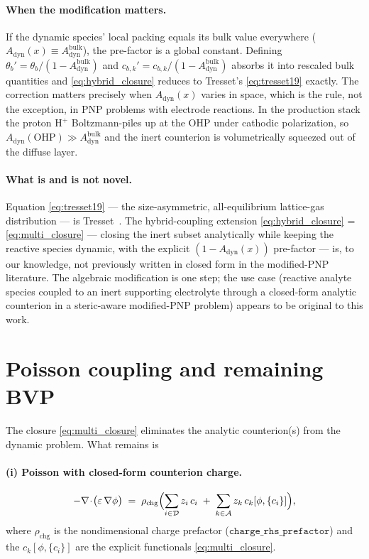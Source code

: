 \documentclass[11pt]{article}
\newcommand{\dynset}{\mathcal{D}}      %
\newcommand{\anset}{\mathcal{A}}       %
\begin{document}
\paragraph{When the modification matters.}
If the dynamic species' local packing equals its bulk value
everywhere ($A_{\mathrm{dyn}}(x) \equiv A_{\mathrm{dyn}}^{\mathrm{bulk}}$),
the pre-factor is a global constant. Defining $\theta_b' =
\theta_b/(1 - A_{\mathrm{dyn}}^{\mathrm{bulk}})$ and
$c_{b,k}' = c_{b,k}/(1 - A_{\mathrm{dyn}}^{\mathrm{bulk}})$ absorbs
it into rescaled bulk quantities and \eqref{eq:hybrid_closure}
reduces to Tresset's \eqref{eq:tresset19} exactly. The correction
matters precisely when $A_{\mathrm{dyn}}(x)$ varies in space, which
is the rule, not the exception, in PNP problems with electrode
reactions. In the production stack the proton $\mathrm{H}^+$
Boltzmann-piles up at the OHP under cathodic polarization, so
$A_{\mathrm{dyn}}(\mathrm{OHP}) \gg A_{\mathrm{dyn}}^{\mathrm{bulk}}$
and the inert counterion is volumetrically squeezed out of the
diffuse layer.

\paragraph{What is and is not novel.}
Equation \eqref{eq:tresset19} --- the size-asymmetric,
all-equilibrium lattice-gas distribution --- is
Tresset~\cite{Tresset2008}. The hybrid-coupling
extension \eqref{eq:hybrid_closure} = \eqref{eq:multi_closure} ---
closing the inert subset analytically while keeping the reactive
species dynamic, with the explicit $(1 - A_{\mathrm{dyn}}(x))$
pre-factor --- is, to our knowledge, not previously written in
closed form in the modified-PNP literature. The algebraic
modification is one step; the use case (reactive analyte species
coupled to an inert supporting electrolyte through a closed-form
analytic counterion in a steric-aware modified-PNP problem)
appears to be original to this work.

\section{Poisson coupling and remaining BVP}

The closure \eqref{eq:multi_closure} eliminates the analytic
counterion(s) from the dynamic problem. What remains is

\paragraph{(i) Poisson with closed-form counterion charge.}
\begin{equation}
-\nabla\!\cdot\!\bigl(\varepsilon\,\nabla\phi\bigr)
\;=\; \rho_{\mathrm{chg}}\Bigl(
        \sum_{i\in\dynset} z_i\,c_i
        \;+\; \sum_{k\in\anset} z_k\,c_k[\phi,\{c_i\}]
      \Bigr),
\end{equation}
where $\rho_{\mathrm{chg}}$ is the nondimensional charge prefactor
($\texttt{charge\_rhs\_prefactor}$) and the $c_k[\phi,\{c_i\}]$ are the
explicit functionals \eqref{eq:multi_closure}.
\end{document}
